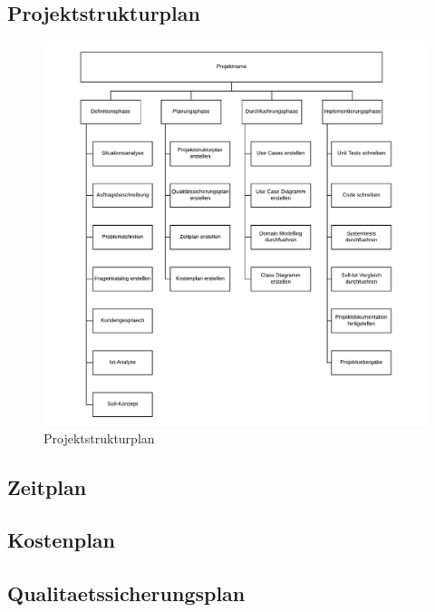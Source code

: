 \documentclass[11pt, a4paper]{article}
\begin{document}
    \subsection{Projektstrukturplan}
      \begin{figure}[h!]
        \includegraphics[width=\linewidth]{fig/Projektstrukturplan.pdf}
        \caption{Projektstrukturplan}
        \label{fig:psp}
      \end{figure}
      \newpage

    \subsection{Zeitplan}
      \newpage

    \subsection{Kostenplan}
      \newpage

    \subsection{Qualitaetssicherungsplan}
      \newpage
\end{document}
